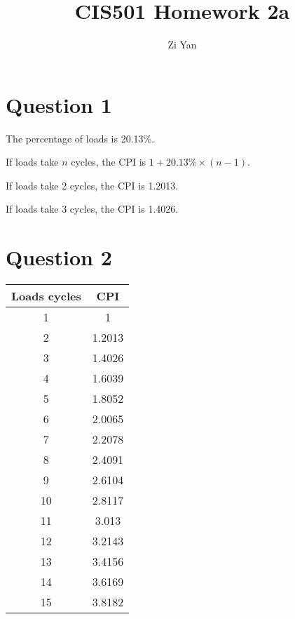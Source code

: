 \documentclass[12pt,letterpaper]{article}
\author{Zi Yan}
\date{}
\title{CIS501 Homework 2a}
\begin{document}
\maketitle

\section*{Question 1}
The percentage of loads is 20.13\%.

If loads take $n$ cycles, the CPI is $1+20.13\% \times (n-1)$.

If loads take 2 cycles, the CPI is 1.2013.

If loads take 3 cycles, the CPI is 1.4026.

\section*{Question 2}
\begin{tabular}{|c|c|}
\hline 
Loads cycles & CPI \\ 
\hline 
1 & 1 \\ 
\hline 
2 & 1.2013 \\ 
\hline 
3 & 1.4026 \\ 
\hline 
4 & 1.6039 \\ 
\hline 
5 & 1.8052 \\ 
\hline 
6 & 2.0065 \\ 
\hline 
7 & 2.2078 \\ 
\hline 
8 & 2.4091 \\ 
\hline 
9 & 2.6104 \\ 
\hline 
10 & 2.8117 \\ 
\hline 
11 & 3.013 \\ 
\hline 
12 & 3.2143 \\ 
\hline 
13 & 3.4156 \\ 
\hline 
14 & 3.6169 \\ 
\hline 
15 & 3.8182 \\ 
\hline 
\end{tabular} 
\end{document}
